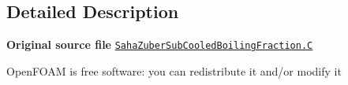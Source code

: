 \subsection{Detailed Description}
{\bfseries Original source file} \href{../../../home/carlo/data/GeN-Foam/GeN-Foam_ffn/GeN-Foam/GeN-Foam/classes/thermalHydraulics/src/physicsModels/heatTransferModels/FSHeatTransferCoefficientModels/subModels/subCooledBoilingFractionModels/SahaZuber/SahaZuberSubCooledBoilingFraction.C}{\tt Saha\+Zuber\+Sub\+Cooled\+Boiling\+Fraction.\+C}

Open\+F\+O\+AM is free software\+: you can redistribute it and/or modify it 